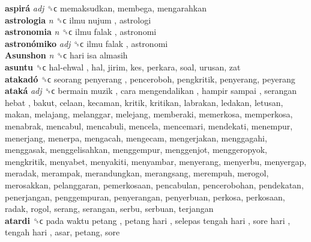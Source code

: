 \textbf{aspirá} \emph{adj}  ␝ϲ  memaksudkan, membega, mengarahkan  \\
\textbf{astrologia} \emph{n}  ␝ϲ   ilmu nujum , astrologi  \\
\textbf{astronomia} \emph{n}  ␝ϲ   ilmu falak , astronomi  \\
\textbf{astronómiko} \emph{adj}  ␝ϲ   ilmu falak , astronomi  \\
\textbf{Asunshon} \emph{n}  ␝ϲ   hari isa almasih   \\
\textbf{asuntu} ␝ϲ   hal-ehwal , hal, jirim, kes, perkara, soal, urusan, zat  \\
\textbf{atakadó} ␝ϲ   seorang penyerang , penceroboh, pengkritik, penyerang, peyerang  \\
\textbf{ataká} \emph{adj}  ␝ϲ   bermain muzik ,  cara mengendalikan ,  hampir sampai ,  serangan hebat , bakut, celaan, kecaman, kritik, kritikan, labrakan, ledakan, letusan, makan, melajang, melanggar, melejang, memberaki, memerkosa, memperkosa, menabrak, mencabul, mencabuli, mencela, mencemari, mendekati, menempur, menerjang, menerpa, mengacah, mengecam, mengerjakan, menggagahi, menggasak, menggelisahkan, menggempur, menggenjot, menggeropyok, mengkritik, menyabet, menyakiti, menyambar, menyerang, menyerbu, menyergap, meradak, merampak, merandungkan, merangsang, merempuh, merogol, merosakkan, pelanggaran, pemerkosaan, pencabulan, pencerobohan, pendekatan, penerjangan, penggempuran, penyerangan, penyerbuan, perkosa, perkosaan, radak, rogol, serang, serangan, serbu, serbuan, terjangan  \\
\textbf{atardi} ␝ϲ   pada waktu petang ,  petang hari ,  selepas tengah hari ,  sore hari ,  tengah hari , asar, petang, sore  \\
